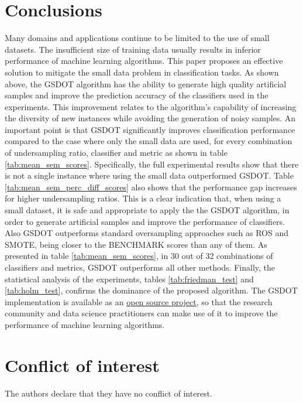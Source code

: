 \section{Conclusions}
\label{conclusions}

Many domains and applications continue to be limited to the use of small datasets. The insufficient size of training data usually results in inferior performance of machine learning algorithms. This paper proposes an effective solution to mitigate the small data problem in classification tasks. As shown above, the GSDOT algorithm has the ability to generate high quality artificial samples and improve the prediction accuracy of the classifiers used in the experiments. This improvement relates to the algorithm's capability of increasing the diversity of new instances while avoiding the generation of noisy samples. An important point is that GSDOT significantly improves classification performance compared to the case where only the small data are used, for every combination of undersampling ratio, classifier and metric as shown in table \ref{tab:mean_sem_scores}. Specifically, the full experimental results show that there is not a single instance where using the small data outperformed GSDOT. Table \ref{tab:mean_sem_perc_diff_scores} also shows that the performance gap increases for higher undersampling ratios. This is a clear indication that, when using a small dataset, it is safe and appropriate to apply the the GSDOT algorithm, in order to generate artificial samples and improve the performance of classifiers. Also GSDOT outperforms standard oversampling approaches such as ROS and SMOTE, being closer to the BENCHMARK scores than any of them. As presented in table \ref{tab:mean_sem_scores}, in 30 out of 32 combinations of classifiers and metrics, GSDOT outperforms all other methods. Finally, the statistical analysis of the experiments, tables \ref{tab:friedman_test} and \ref{tab:holm_test}, confirms the dominance of the proposed algorithm. The GSDOT implementation is available as an \href{https://geometric-smote.readthedocs.io/en/latest/?badge=latest}{open source project}, so that the research community and data science practitioners can make use of it to improve the performance of machine learning algorithms.

\section*{Conflict of interest}
The authors declare that they have no conflict of interest.







